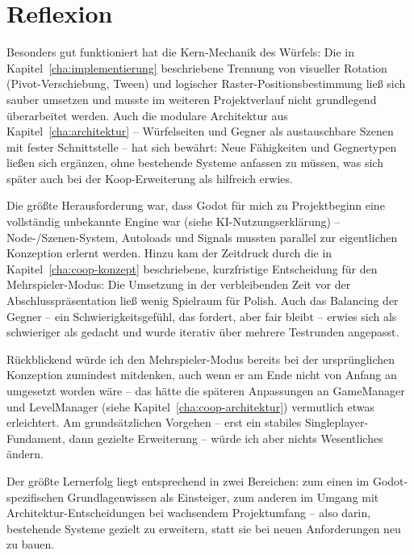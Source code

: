 \documentclass[oneside]{ausarbeitung}
\begin{document}



\chapter{Reflexion}
\label{cha:reflexion}

Besonders gut funktioniert hat die Kern-Mechanik des Würfels: Die in Kapitel~\ref{cha:implementierung}
beschriebene Trennung von visueller Rotation (Pivot-Verschiebung, Tween) und logischer
Raster-Positionsbestimmung ließ sich sauber umsetzen und musste im weiteren Projektverlauf nicht
grundlegend überarbeitet werden. Auch die modulare Architektur aus Kapitel~\ref{cha:architektur} --
Würfelseiten und Gegner als austauschbare Szenen mit fester Schnittstelle -- hat sich bewährt: Neue
Fähigkeiten und Gegnertypen ließen sich ergänzen, ohne bestehende Systeme anfassen zu müssen, was sich
später auch bei der Koop-Erweiterung als hilfreich erwies.

Die größte Herausforderung war, dass Godot für mich zu Projektbeginn eine vollständig unbekannte Engine
war (siehe KI-Nutzungserklärung) -- Node-/Szenen-System, Autoloads und Signals mussten parallel zur
eigentlichen Konzeption erlernt werden. Hinzu kam der Zeitdruck durch die in
Kapitel~\ref{cha:coop-konzept} beschriebene, kurzfristige Entscheidung für den Mehrspieler-Modus: Die
Umsetzung in der verbleibenden Zeit vor der Abschlusspräsentation ließ wenig Spielraum für Polish.
Auch das Balancing der Gegner -- ein Schwierigkeitsgefühl, das fordert, aber fair bleibt -- erwies sich
als schwieriger als gedacht und wurde iterativ über mehrere Testrunden angepasst.

Rückblickend würde ich den Mehrspieler-Modus bereits bei der ursprünglichen Konzeption zumindest
mitdenken, auch wenn er am Ende nicht von Anfang an umgesetzt worden wäre -- das hätte die späteren
Anpassungen an GameManager und LevelManager (siehe Kapitel~\ref{cha:coop-architektur}) vermutlich
etwas erleichtert. Am grundsätzlichen Vorgehen -- erst ein stabiles Singleplayer-Fundament, dann
gezielte Erweiterung -- würde ich aber nichts Wesentliches ändern.

Der größte Lernerfolg liegt entsprechend in zwei Bereichen: zum einen im Godot-spezifischen
Grundlagenwissen als Einsteiger, zum anderen im Umgang mit Architektur-Entscheidungen bei wachsendem
Projektumfang -- also darin, bestehende Systeme gezielt zu erweitern, statt sie bei neuen Anforderungen
neu zu bauen.


\appendix

\printbibliography[heading=bibintoc]
\end{document}
